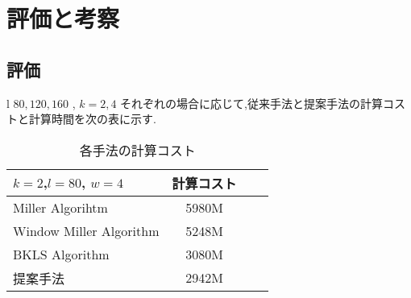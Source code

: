 
\chapter{評価と考察}
\section{評価}
l \approx $80,120,160$ , $k=2, 4$ それぞれの場合に応じて,従来手法と提案手法の計算コストと計算時間を次の表に示す.

\begin{table}[htbp]
 \begin{center}
  \begin{tabular}{|l|c|c|c|}
  \hline
  $k=2$,$l=80$, $w=4$ & 計算コスト \\
  \hline
  Miller Algorihtm & 5980M \\
  \hline
  Window Miller Algorithm & 5248M \\
  \hline
  BKLS Algorithm &  3080M \\
  \hline
  提案手法 & 2942M \\
  \hline
  \end{tabular}
 \end{center}
 \caption{各手法の計算コスト}
\end{table}

